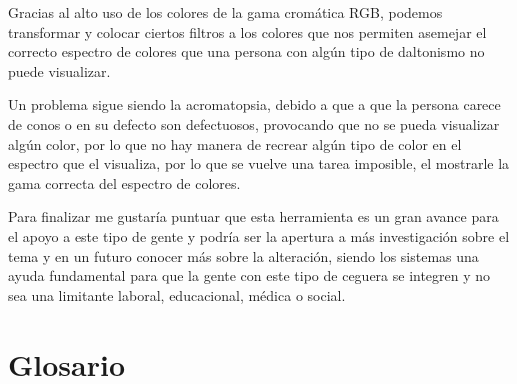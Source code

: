 \documentclass[10pt]{article}
\begin{document}
Gracias al alto uso de los colores de la gama cromática RGB, podemos transformar y colocar ciertos filtros a los colores que nos permiten asemejar el correcto espectro de colores que una persona con algún tipo de daltonismo no puede visualizar.

Un problema sigue siendo la acromatopsia, debido a que a que la persona carece de conos o en su defecto son defectuosos, provocando que no se pueda visualizar algún color, por lo que no hay manera de recrear algún tipo de color en el espectro que el visualiza, por lo que se vuelve una tarea imposible, el mostrarle la gama correcta del espectro de colores.

Para finalizar me gustaría puntuar que esta herramienta es un gran avance para el apoyo a este tipo de gente y podría ser la apertura a más investigación sobre el tema y en un futuro conocer más sobre la alteración, siendo los sistemas una ayuda fundamental para que la gente con este tipo de ceguera se integren y no sea una limitante laboral, educacional, médica o social.
\newpage
\section{Glosario}
\end{document}
